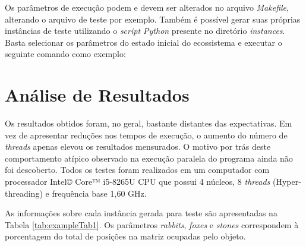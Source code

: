 \documentclass[a4paper, 12pt]{article}
\begin{document}
Os parâmetros de execução podem e devem ser alterados no arquivo \emph{Makefile}, alterando o arquivo de teste por exemplo. Também é possível gerar suas próprias instâncias de teste utilizando o \emph{script Python} presente no diretório \emph{instances}. Basta selecionar os parâmetros do estado inicial do ecossistema e executar o seguinte comando como exemplo:

\begin{center}
\end{center}

\section{Análise de Resultados}

Os resultados obtidos foram, no geral, bastante distantes das expectativas. Em vez de apresentar reduções nos tempos de execução, o aumento do número de \emph{threads} apenas elevou os resultados mensurados. O motivo por trás deste comportamento atípico observado na execução paralela do programa ainda não foi descoberto. Todos os testes foram realizados em um computador com processador Intel© Core™ i5-8265U CPU que possui 4 núcleos, 8 \emph{threads} (Hyper-threading) e frequência base 1,60 GHz.

As informações sobre cada instância gerada para teste são apresentadas na Tabela \ref{tab:exampleTab1}. Os parâmetros \emph{rabbits}, \emph{foxes} e \emph{stones} correspondem à porcentagem do total de posições na matriz ocupadas pelo objeto.
\begin{table}[H]
    \centering
    \caption{Parâmetros das Instâncias de Teste}
    \label{tab:exampleTab1}
    \vspace{0.2cm}
\end{table}
\end{document}
